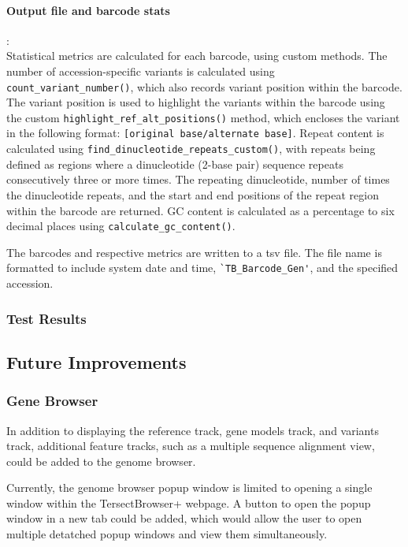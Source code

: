 \documentclass[12pt]{article}
\begin{document}
\paragraph{Output file and barcode stats}: \\
Statistical metrics are calculated for each barcode, using custom methods. The number of accession-specific variants is calculated using \verb+count_variant_number()+, which also records variant position within the barcode. The variant position is used to highlight the variants within the barcode using the custom \verb+highlight_ref_alt_positions()+ method, which encloses the variant in the following format: \verb+[original base/alternate base]+. Repeat content is calculated using \verb+find_dinucleotide_repeats_custom()+, with repeats being defined as regions where a dinucleotide (2-base pair) sequence repeats consecutively three or more times. The repeating dinucleotide, number of times the dinucleotide repeats, and the start and end positions of the repeat region within the barcode are returned. GC content is calculated as a percentage to six decimal places using \verb+calculate_gc_content()+. 

The barcodes and respective metrics are written to a tsv file. The file name is formatted to include system date and time, \verb+`TB_Barcode_Gen'+, and the specified accession. 

\subsubsection{Test Results}

\subsection{Future Improvements}

\subsubsection{Gene Browser}
In addition to displaying the reference track, gene models track, and variants track, additional feature tracks, such as a multiple sequence alignment view, could be added to the genome browser.

Currently, the genome browser popup window is limited to opening a single window within the TersectBrowser+ webpage. A button to open the popup window in a new tab could be added, which would allow the user to open multiple detatched popup windows and view them simultaneously.
\end{document}
